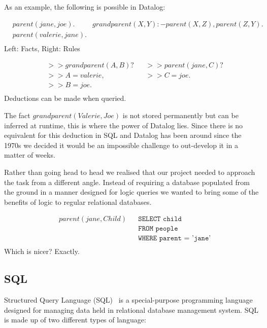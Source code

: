 \documentclass[a4paper, 11pt]{article}
\begin{document}
As an example, the following is possible in Datalog:
\begin{center}
  \begin{align*}
    &parent(jane, joe).     & grandparent(X, Y) :- parent(X, Z), parent(Z, Y). \\
    &parent(valerie, jane). & \\
  \end{align*}
  Left: Facts, Right: Rules 
  
  \begin{align*}
    &>> grandparent(A, B)?  & & >> parent(jane, C)? \\
    &>> A = valerie,        & & >> C = joe. \\
    &>> B = joe.            & & \\
  \end{align*}
  Deductions can be made when queried.
\end{center}

The fact $grandparent(Valerie, Joe)$ is not stored permanently but can be inferred at runtime, this is where the power of Datalog lies. Since there is no equivalent for this deduction in SQL and Datalog has been around since the 1970s we decided it would be an impossible challenge to out-develop it in a matter of weeks.

Rather than going head to head we realised that our project needed to approach the task from a different angle. Instead of requiring a database populated from the ground in a manner designed for logic queries we wanted to bring some of the benefits of logic to regular relational databases.
\begin{center}
  \begin{align*}
    & parent(jane, Child) & & \texttt{SELECT child} \\
    &                     & & \texttt{FROM people} \\
    &                     & & \texttt{WHERE parent = 'jane'} \\
  \end{align*}
  Which is nicer? Exactly.
\end{center}

\subsection{SQL}
  Structured Query Language (SQL)~\cite{wiki:SQL} is a special-purpose
  programming language designed for managing data held in relational database
  management system. SQL is made up of two different types of language:
\end{document}

